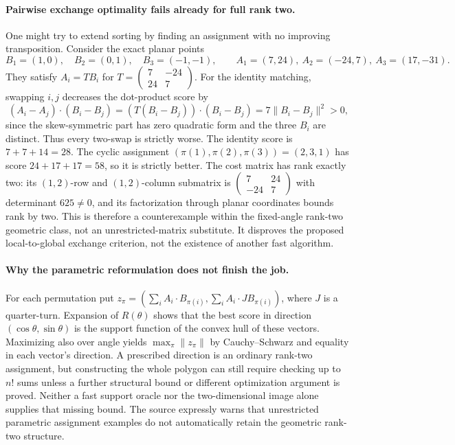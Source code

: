 \documentclass[11pt]{article}
\begin{document}
\paragraph{Pairwise exchange optimality fails already for full rank two.}
One might try to extend sorting by finding an assignment with no improving
transposition. Consider the exact planar points
\[
B_1=(1,0),\quad B_2=(0,1),\quad B_3=(-1,-1),
\qquad A_1=(7,24),\ A_2=(-24,7),\ A_3=(17,-31).
\]
They satisfy $A_i=TB_i$ for
$T=\begin{pmatrix}7&-24\\24&7\end{pmatrix}$.
For the identity matching, swapping $i,j$ decreases the dot-product score by
\[
(A_i-A_j)\cdot(B_i-B_j)
=(T(B_i-B_j))\cdot(B_i-B_j)=7\|B_i-B_j\|^2>0,
\]
since the skew-symmetric part has zero quadratic form and the three $B_i$
are distinct. Thus every two-swap is strictly worse. The identity score is
$7+7+14=28$. The cyclic assignment $(\pi(1),\pi(2),\pi(3))=(2,3,1)$
has score $24+17+17=58$, so it is strictly better. The cost matrix has
rank exactly two: its $(1,2)$-row and $(1,2)$-column submatrix is
$\begin{pmatrix}7&24\\-24&7\end{pmatrix}$ with determinant $625\ne0$,
and its factorization through planar coordinates bounds rank by two.
This is therefore a counterexample within the fixed-angle rank-two geometric
class, not an unrestricted-matrix substitute. It disproves the proposed
local-to-global exchange criterion, not the existence of another fast algorithm.

\paragraph{Why the parametric reformulation does not finish the job.}
For each permutation put
$z_\pi=(\sum_i A_i\cdot B_{\pi(i)},\sum_i A_i\cdot J B_{\pi(i)})$,
where $J$ is a quarter-turn. Expansion of $R(\theta)$ shows that the best
score in direction $(\cos\theta,\sin\theta)$ is the support function
of the convex hull of these vectors. Maximizing also over angle yields
$\max_\pi\|z_\pi\|$ by Cauchy--Schwarz and equality in each vector's
direction. A prescribed direction is an ordinary rank-two assignment, but
constructing the whole polygon can still require checking up to $n!$ sums
unless a further structural bound or different optimization argument is proved.
Neither a fast support oracle nor the two-dimensional image alone supplies
that missing bound. The source expressly warns that unrestricted parametric
assignment examples do not automatically retain the geometric rank-two structure.
\end{document}

